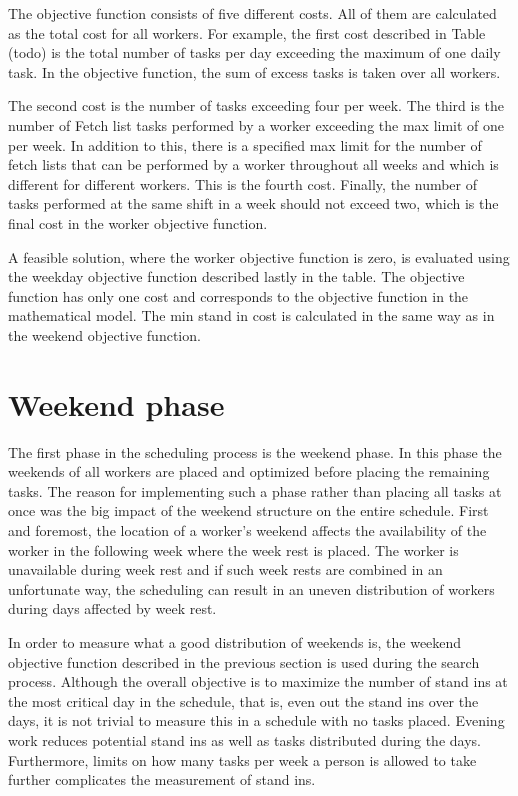 The objective function consists of five different costs. All of them are calculated as the total cost for all workers. For example, the first cost described in Table (todo) is the total number of tasks per day exceeding the maximum of one daily task. In the objective function, the sum of excess tasks is taken over all workers.

The second cost is the number of tasks exceeding four per week. The third is the number of Fetch list tasks performed by a worker exceeding the max limit of one per week. In addition to this, there is a specified max limit for the number of fetch lists that can be performed by a worker throughout all weeks and which is different for different workers. This is the fourth cost. Finally, the number of tasks performed at the same shift in a week should not exceed two, which is the final cost in the worker objective function.

A feasible solution, where the worker objective function is zero, is evaluated using the weekday objective function described lastly in the table. The objective function has only one cost and corresponds to the objective function in the mathematical model. The min stand in cost is calculated in the same way as in the weekend objective function.

\section{Weekend phase}

The first phase in the scheduling process is the weekend phase. In this phase the weekends of all workers are placed and optimized before placing the remaining tasks. The reason for implementing such a phase rather than placing all tasks at once was the big impact of the weekend structure on the entire schedule. First and foremost, the location of a worker's weekend affects the availability of the worker in the following week where the week rest is placed. The worker is unavailable during week rest and if such week rests are combined in an unfortunate way, the scheduling can result in an uneven distribution of workers during days affected by week rest.

In order to measure what a good distribution of weekends is, the weekend objective function described in the previous section is used during the search process. Although the overall objective is to maximize the number of stand ins at the most critical day in the schedule, that is, even out the stand ins over the days, it is not trivial to measure this in a schedule with no tasks placed. Evening work reduces potential stand ins as well as tasks distributed during the days. Furthermore, limits on how many tasks per week a person is allowed to take further complicates the measurement of stand ins.

